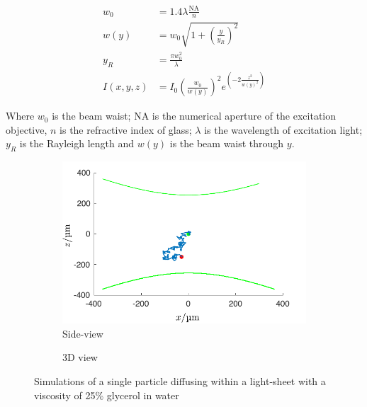 \begin{align}
  w_0 &= 1.4 \lambda \frac{ \text{NA}}{n}\\
  w(y) &= w_0 \sqrt{1+\left(\frac{y}{y_R}\right)^2}\\
  y_R &= \frac{\pi w_0^2}{\lambda}\\
  I(x,y,z) &= I_0 \left(\frac{w_0}{w(y)}\right)^2 e^{\left(-2\frac{z^2}{w(y)^2}\right)}
\end{align}

Where $w_0$ is the beam waist; NA is the numerical aperture of the excitation objective, $n$ is the refractive index of glass; $\lambda$ is the wavelength of excitation light; $y_R$ is the Rayleigh length and $w(y)$ is the beam waist through $y$.



\begin{figure}
  \centering
  \begin{subfigure}[b]{0.8\linewidth}
    \centering
    \includegraphics{./simulation/size_view_diffusion}
    \caption{Side-view}
    \label{fig:size_view_diffusion}
  \end{subfigure}
  \begin{subfigure}[b]{0.8\linewidth}
    \centering
    \caption{3D view}
    \label{fig:diffusion_3d}
  \end{subfigure}
  \caption{Simulations of a single particle diffusing within a light-sheet with a viscosity of 25\% glycerol in water}
  \label{fig:diffusion}
\end{figure}

